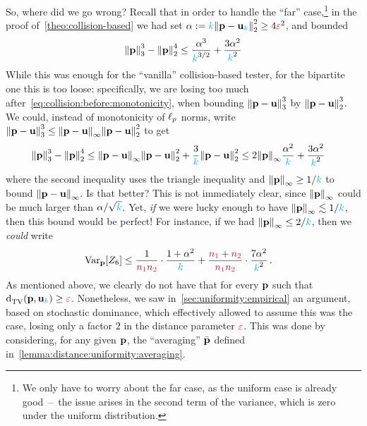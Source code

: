 So, where did we go wrong? Recall that in order to handle the ``far'' case,\footnote{We only have to worry about the far case, as the uniform case is already good~--~the issue arises in the second term of the variance, which is zero under the uniform distribution.} in the proof of~\cref{theo:collision-based} we had set $\alpha \eqdef \ab\normtwo{\p-\uniform_\ab}^2 \geq 4\dst^2$, and bounded
\[
    \norm{\p}_3^3-\normtwo{\p}^4 \leq \frac{\alpha^{3}}{\ab^{3/2}} + \frac{3\alpha^2}{\ab^2}
\]
While this was enough for the ``vanilla'' collision-based tester, for the bipartite one this is too loose: specifically, we are losing too much after~\cref{eq:collision:before:monotonicity}, when bounding
$\norm{\p-\uniform}_3^3$ by $\normtwo{\p-\uniform}^3$. We could, instead of monotonicity of $\lp[p]$ norms, write
$\norm{\p-\uniform}_3^3 \leq \norminf{\p-\uniform}\normtwo{\p-\uniform}^2$ to get
    \begin{align*}
        \norm{\p}_3^3-\normtwo{\p}^4
        &\leq \norminf{\p-\uniform}\normtwo{\p-\uniform}^2 + \frac{3}{\ab}\normtwo{\p-\uniform}^2
        \leq 2\norminf{\p}\frac{\alpha^{2}}{\ab} + \frac{3\alpha^2}{\ab^2}
    \end{align*}
where the second inequality uses the triangle inequality and $\norminf{\p}\geq 1/\ab$ to bound $\norminf{\p-\uniform}$. Is that better? This is not immediately clear, since $\norminf{\p}$ could be much larger than $\alpha/\sqrt{\ab}$. Yet, \emph{if} we were lucky enough to have $\norminf{\p}\lesssim 1/\ab$, then this bound would be perfect! For instance, if we had $\norminf{\p}\leq 2/\ab$, then we \emph{could} write
\begin{align}
  \Var_\p[Z_6]
  &\leq \frac{1}{\nss\nst}\cdot \frac{1+\alpha^2}{\ab} + \frac{\nss+\nst}{\nss\nst}\cdot \frac{7\alpha^2}{\ab^2} \label{eq:var:bipartite:collisions:lowinfty}\,.
\end{align}
As mentioned above, we clearly do not have that for every $\p$ such that $\totalvardist{\p}{\uniform_\ab}\geq \dst$. Nonetheless, we saw in~\cref{sec:uniformity:empirical} an argument, based on stochastic dominance, which effectively allowed to assume this was the case, losing only a factor $2$ in the distance parameter $\dst$. This was done by considering, for any given $\p$, the ``averaging'' $\bar{\p}$ defined in~\cref{lemma:distance:uniformity:averaging}.

